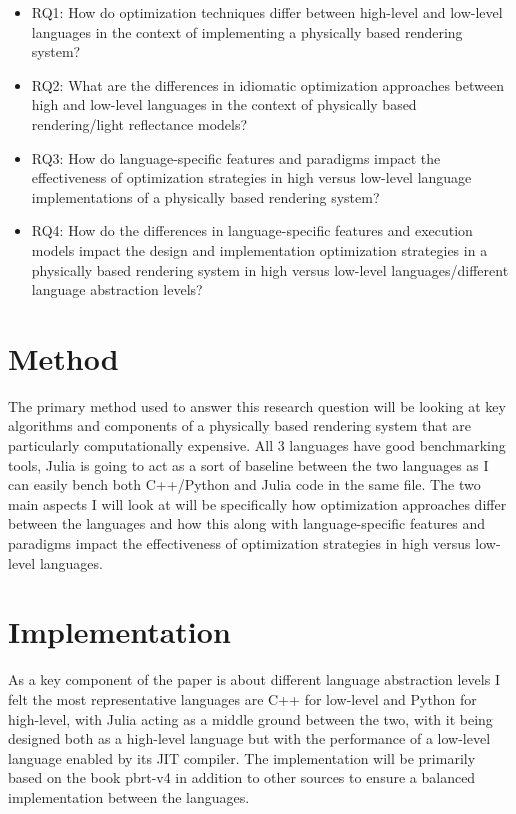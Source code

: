 \documentclass[11pt,a4paper,oneside]{article}
\begin{document}
\begin{itemize}[leftmargin=*, noitemsep]
    \item RQ1: How do optimization techniques differ between high-level and low-level languages in the context of implementing a physically based rendering system?
    \item RQ2: What are the differences in idiomatic optimization approaches between high and low-level languages in the context of physically based rendering/light reflectance models?
    \item RQ3: How do language-specific features and paradigms impact the effectiveness of optimization strategies in high versus low-level language implementations of a physically based rendering system? 
    \item RQ4: How do the differences in language-specific features and execution models impact the design and implementation optimization strategies in a physically based rendering system in high versus low-level languages/different language abstraction levels?
\end{itemize}

\section{Method}

The primary method used to answer this research question will be looking at key algorithms and components of a physically based rendering system that are particularly computationally expensive. All 3 languages have good benchmarking tools, Julia is going to act as a sort of baseline between the two languages as I can easily bench both C++/Python and Julia code in the same file. The two main aspects I will look at will be specifically how optimization approaches differ between the languages and how this along with language-specific features and paradigms impact the effectiveness of optimization strategies in high versus low-level languages.

\section{Implementation}

As a key component of the paper is about different language abstraction levels I felt the most representative languages are C++ for low-level and Python for high-level, with Julia acting as a middle ground between the two, with it being designed both as a high-level language but with the performance of a low-level language enabled by its JIT compiler. The implementation will be primarily based on the book pbrt-v4 in addition to other sources to ensure a balanced implementation between the languages. 
\end{document}
